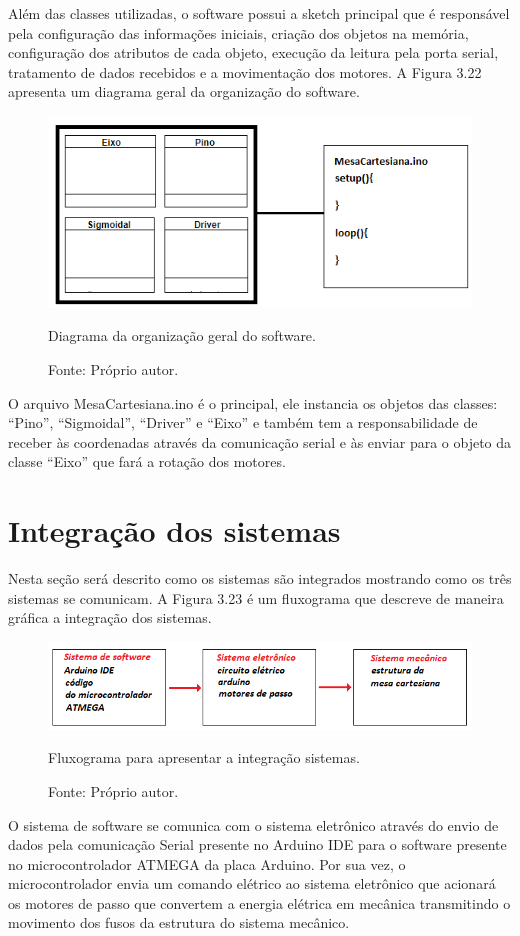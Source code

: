 Além das classes utilizadas, o software possui a sketch principal que é responsável pela configuração das 
informações iniciais, criação dos objetos na memória, configuração dos atributos de cada objeto, execução 
da leitura pela porta serial, tratamento de dados recebidos e a movimentação dos motores.
A Figura 3.22 apresenta um diagrama geral da organização do software.

\begin{figure}[!htb]
\centering
\includegraphics[scale = 0.85]{figuras/3-22}
\caption{Diagrama da organização geral do software.}
\caption*{Fonte: Próprio autor.}
\label{figorgsoftware}
\end{figure}
    
O arquivo MesaCartesiana.ino é o principal, ele instancia os objetos das classes: “Pino”, “Sigmoidal”, 
“Driver” e “Eixo” e também tem a responsabilidade de receber às coordenadas através da comunicação serial 
e às enviar para o objeto da classe “Eixo” que fará a rotação dos motores.

\section{Integração dos sistemas}

Nesta seção será descrito como os sistemas são integrados mostrando como os três sistemas se comunicam. 
A Figura 3.23 é um fluxograma que descreve de maneira gráfica a integração dos sistemas.

\begin{figure}[!htb]
\centering
\includegraphics[scale = 0.9]{figuras/3-23}
\caption{Fluxograma para apresentar a integração sistemas.}
\caption*{Fonte: Próprio autor.}
\label{figintegracao}
\end{figure}
    
O sistema de software se comunica com o sistema eletrônico através do envio de dados pela comunicação 
Serial presente no Arduino IDE para o software presente no microcontrolador ATMEGA da placa Arduino. 
Por sua vez, o microcontrolador envia um comando elétrico ao sistema eletrônico que acionará os motores 
de passo que convertem a energia elétrica em mecânica transmitindo o movimento dos fusos da estrutura do 
sistema mecânico.